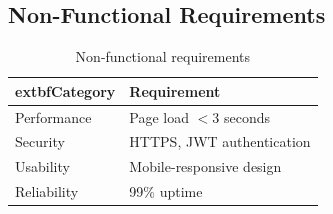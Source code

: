 \subsection{Non-Functional Requirements}
\begin{table}[H]
	\centering
	\begin{tabular}{|l|l|}
		\hline
			extbf{Category} & \textbf{Requirement} \\
		\hline
		Performance & Page load $< 3$ seconds \\
		Security & HTTPS, JWT authentication \\
		Usability & Mobile-responsive design \\
		Reliability & 99\% uptime \\
		\hline
	\end{tabular}
	\caption{Non-functional requirements}
	\label{tab:nfr}
\end{table}
